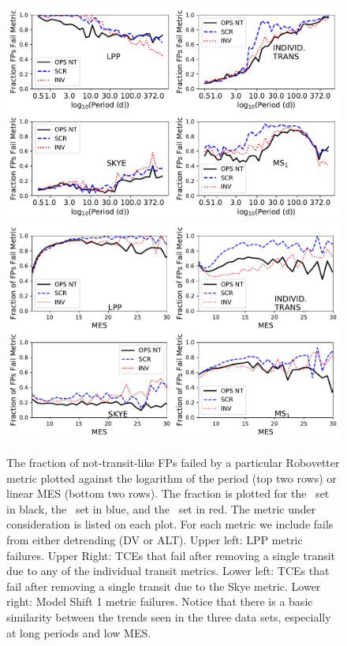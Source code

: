 \begin{figure}[hp]
    \centering
    \includegraphics[width=0.93\linewidth]{f6-top.pdf}
    \includegraphics[width=0.93\linewidth]{f6-bottom.pdf}
    \caption{The fraction of not-transit-like FPs failed by a particular Robovetter metric plotted against the logarithm of the period (top two rows) or linear MES (bottom two rows).  The fraction is plotted for the \opstce\ set in black, the \scrtce\ set in blue, and the \invtce\ set in red. The metric under consideration is listed on each plot.  For each metric we include fails from either detrending (DV or ALT). Upper left: LPP metric failures. Upper Right: TCEs that fail after removing a single transit due to any of the individual transit metrics.  Lower left: TCEs that fail after removing a single transit due to the Skye metric. Lower right: Model Shift 1 metric failures. Notice that there is a basic similarity between the trends seen in the three data sets, especially at long periods and low MES.}
    \label{f:fractionFailMetric}
\end{figure}


